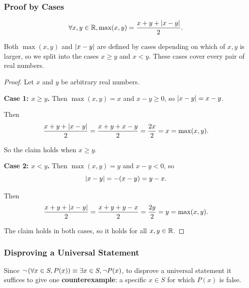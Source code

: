 \subsubsection{Proof by Cases}
\begin{proposition}
    \begin{equation*}
        \forall x, y \in \mathbb{R}, \max(x, y) = \frac{x + y + \left|x - y \right|}{2}.
    \end{equation*}
\end{proposition}
\begin{remark}
    Both $\max(x, y)$ and $\left|x - y\right|$ are defined by cases depending on which of $x, y$ is larger,
    so we split into the cases $x \geq y$ and $x < y$. These cases cover every pair of real numbers.
\end{remark}
\begin{proof}
    Let $x$ and $y$ be arbitrary real numbers.

    \textbf{Case 1: $x\geq y$.} Then $\max(x, y) = x$ and $x - y \geq 0$, so $\left|x - y \right| = x - y$.

    Then
    \begin{equation*}
        \frac{x + y + \left|x - y \right|}{2} = \frac{x + y + x - y }{2 } = \frac{2x }{2 } = x = \max(x, y).
    \end{equation*}

    So the claim holds when $x \geq y$.

    \textbf{Case 2: $x<y$.} Then $\max(x, y) = y$ and $x - y < 0$, so
    \begin{equation*}
        \left|x - y \right| = -(x - y) = y - x.
    \end{equation*}

    Then
    \begin{equation*}
        \frac{x + y + \left|x - y \right|}{2} = \frac{x + y + y - x }{2} = \frac{2y}{2} = y = \max(x, y).
    \end{equation*}

    The claim holds in both cases, so it holds for all $x, y \in \mathbb{R}$.
\end{proof}

\subsubsection{Disproving a Universal Statement}
Since $\neg \left(\forall x \in S, P(x)\right) \equiv \exists x \in S, \neg P(x)$, to disprove a universal
statement it suffices to give one \textbf{counterexample}: a specific $x \in S$ for which $P(x)$ is false.

